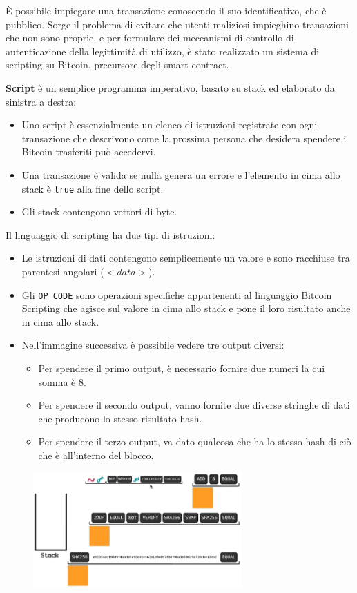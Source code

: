 \vspace{5mm}

È possibile impiegare una transazione conoscendo il suo identificativo, che è pubblico. Sorge il problema di evitare che utenti maliziosi impieghino transazioni che non sono proprie, e per formulare dei meccanismi di controllo di autenticazione della legittimità di utilizzo, è stato realizzato un sistema di scripting su Bitcoin, precursore degli smart contract.

\textbf{Script} è un semplice programma imperativo, basato su stack ed elaborato da sinistra a destra:
\begin{itemize}
    \item Uno script è essenzialmente un elenco di istruzioni registrate con ogni transazione che descrivono come la prossima persona che desidera spendere i Bitcoin trasferiti può accedervi.
    \item Una transazione è valida se nulla genera un errore e l'elemento in cima allo stack è \texttt{true} alla fine dello script.
    \item Gli stack contengono vettori di byte.
\end{itemize}
Il linguaggio di scripting ha due tipi di istruzioni: 
\begin{itemize}
    \item Le istruzioni di dati contengono semplicemente un valore e sono racchiuse tra parentesi angolari (\texttt{$<data>$}).
    \item Gli \texttt{OP CODE} sono operazioni specifiche appartenenti al linguaggio Bitcoin Scripting che agisce sul valore in cima allo stack e pone il loro risultato anche in cima allo stack.
    \item Nell'immagine successiva è possibile vedere tre output diversi:
    \begin{itemize}
        \item Per spendere il primo output, è necessario fornire due numeri la cui somma è 8.
        \item Per spendere il secondo output, vanno fornite due diverse stringhe di dati che producono lo stesso risultato hash.
        \item Per spendere il terzo output, va dato qualcosa che ha lo stesso hash di ciò che è all'interno del blocco.
    \end{itemize}
\end{itemize}

\begin{figure}[htb!]
    \centering
    \includegraphics[width=8cm]{./Images/cap3/3.13.png}
\end{figure}

